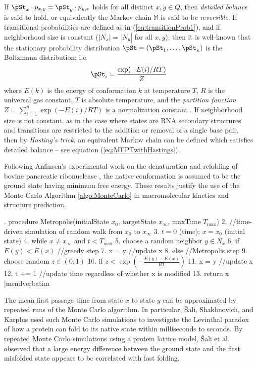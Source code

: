 If $\pSt_x \cdot p_{x,y} = \pSt_y \cdot p_{y,x}$ holds for all distinct
$x,y \in Q$, then
{\em detailed balance} is said to hold, or equivalently the Markov
chain $\mathbb{M}$ is said to be {\em reversible}.
If transitional probabilities
are defined as in (\ref{eq:transitionProb1}), and if neighborhood
size is constant ($|N_x|=|N_y|$ for all $x,y$), then it is well-known
that the stationary probability distribution
$\pSt=(\pSt_1,\ldots,\pSt_n)$ is the Boltzmann distribution; i.e.
\begin{align}
\label{eq:stationaryBoltzmannProb}
\pSt_i = \frac{\exp(-E(i)/RT)}{Z}
\end{align}
where $E(k)$ is the energy of conformation $k$ at temperature $T$,
$R$ is the universal gas constant,
$T$ is absolute temperature, and the {\em partition function}
$Z = \sum_{i=1}^n \exp(-E(i)/RT)$ is a normalization constant
\citep{waterman:book,cloteBackofen:book}. If neighborhood size is not
constant, as in the case where states are RNA secondary structures and transitions
are restricted to the addition or removal of a single base pair, then
by {\em Hasting's trick}, an equivalent Markov chain can be defined which
satisfies detailed balance -- see equation (\ref{eq:MFPTwithHastings}).

Following Anfinsen's experimental work on the denaturation and
refolding of bovine pancreatic ribonuclease \citep{anfinsen},
the native conformation is assumed to be the ground state having
minimum free energy. These results justify the use of the Monte Carlo
Algorithm \ref{algo:MonteCarlo} in macromolecular kinetics and
structure prediction.


. procedure Metropolis(initialState $x_0$, targetState $x_{\infty}$, maxTime $T_{\max}$)
 2. //time-driven simulation of random walk from $x_0$ to $x_{\infty}$
 3.   $t=0$ (time); $x=x_0$ (initial state)
 4.   while $x \ne x_{\infty}$ and $t< T_{\max}$
 5.     choose a random neighbor $y \in N_x$
 6.     if $E(y)<E(x)$  //greedy step
 7.       x = y         //update x
 8.     else            //Metropolis step
 9.       choose random $z \in (0,1)$
10.       if $z < \exp\left(-\frac{E(y)-E(x)}{RT}\right)$
11.         x = y      //update x
12.     t += 1  //update time regardless of whether x is modified
13.   return x
|mendverbatim

The mean first passage time from state $x$ to state $y$ can
be approximated by repeated runs of the Monte Carlo algorithm.
In particular, \v{S}ali, Shakhnovich, and Karplus used such Monte Carlo
simulations to investigate the Levinthal paradox of how a protein
can fold to its native state within milliseconds to seconds.
By repeated Monte Carlo simulations using a protein lattice model,
\v{S}ali et al. observed that a large energy difference between
the ground state
and the first misfolded state appears to be correlated with fast folding.

